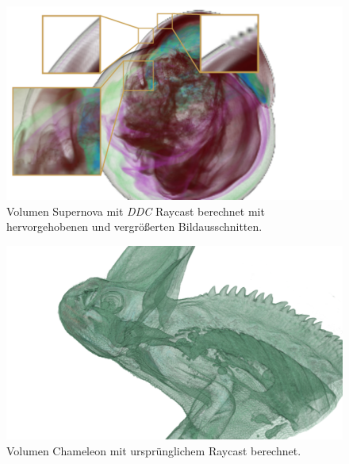 \begin{landscape}
	\begin{figure}
		\centering
		\includegraphics[width=\textheight]{../../Grafiken/results/picture_quality/supernova/DDC_img-1_ray-1-5_edited.png}
		\caption{Volumen Supernova mit \emph{DDC} Raycast berechnet mit hervorgehobenen und vergrößerten Bildausschnitten.}
		\label{fig::res::sup_ddc}
	\end{figure}
\end{landscape}

\iffalse




\begin{landscape}
	\begin{figure}
		\centering
		\includegraphics[width=1\textheight]{../../Grafiken/results/picture_quality/chameleon/Standard_img-1_Ray-1-5.png}
		\caption{Volumen Chameleon mit ursprünglichem Raycast berechnet.}
		\label{fig::res::cam_st}
	\end{figure}
\end{landscape}

